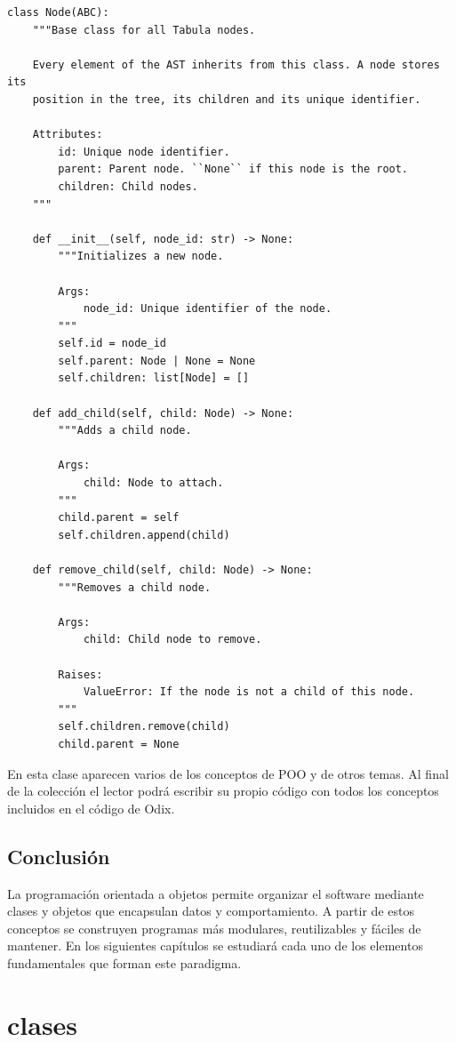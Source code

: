 \documentclass[11pt,a5paper,twoside]{book}
\begin{document}
\begin{tcolorbox}
\scriptsize
 \begin{verbatim}
class Node(ABC):
    """Base class for all Tabula nodes.

    Every element of the AST inherits from this class. A node stores its
    position in the tree, its children and its unique identifier.

    Attributes:
        id: Unique node identifier.
        parent: Parent node. ``None`` if this node is the root.
        children: Child nodes.
    """

    def __init__(self, node_id: str) -> None:
        """Initializes a new node.

        Args:
            node_id: Unique identifier of the node.
        """
        self.id = node_id
        self.parent: Node | None = None
        self.children: list[Node] = []

    def add_child(self, child: Node) -> None:
        """Adds a child node.

        Args:
            child: Node to attach.
        """
        child.parent = self
        self.children.append(child)

    def remove_child(self, child: Node) -> None:
        """Removes a child node.

        Args:
            child: Child node to remove.

        Raises:
            ValueError: If the node is not a child of this node.
        """
        self.children.remove(child)
        child.parent = None
\end{verbatim}
\end{tcolorbox}
En esta clase aparecen varios de los conceptos de POO y de otros temas. Al final de la colección el lector podrá escribir su propio código con todos los conceptos incluidos en el código de Odix.
\subsection{Conclusión}
La programación orientada a objetos permite organizar el software mediante clases y objetos que encapsulan datos y comportamiento. A partir de estos conceptos se construyen programas más modulares, reutilizables y fáciles de mantener. En los siguientes capítulos se estudiará cada uno de los elementos fundamentales que forman este paradigma.

\newpage

\section{clases}
\end{document}
